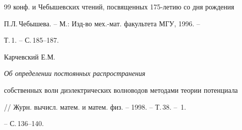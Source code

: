 \begin{thebibliography}{99}
конф. и Чебышевских чтений, посвященных 175-летию со дня рождения


П.Л.\,Чебышева. -- М.: Изд-во мех.-мат. факультета МГУ, 1996. --


Т.\,1. -- С.\,185--187. 






Карчевский Е.М. {\em Об определении постоянных распространения


собственных волн диэлектрических волноводов методами теории потенциала}


// Журн. вычисл. матем. и матем. физ. -- 1998. -- Т.\,38. -- \No\,1. 


-- С.\,136--140. 


\end{thebibliography}





\vskip 2cm












\label{end}





